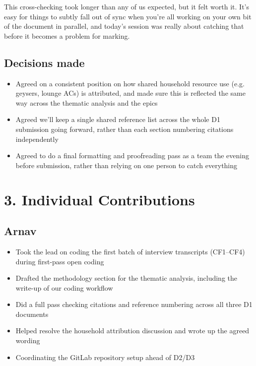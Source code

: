 \documentclass[11pt,a4paper]{article}
\begin{document}
This cross-checking took longer than any of us expected, but it felt worth it. It's easy for things to subtly fall out of sync when you're all working on your own bit of the document in parallel, and today's session was really about catching that before it becomes a problem for marking.

\vspace{6pt}
\subsection*{Decisions made}
\begin{itemize}
    \item Agreed on a consistent position on how shared household resource use (e.g. geysers, lounge ACs) is attributed, and made sure this is reflected the same way across the thematic analysis and the epics
    \item Agreed we'll keep a single shared reference list across the whole D1 submission going forward, rather than each section numbering citations independently
    \item Agreed to do a final formatting and proofreading pass as a team the evening before submission, rather than relying on one person to catch everything
\end{itemize}

\vspace{10pt}
\section*{3. Individual Contributions}

\subsection*{Arnav}
\begin{itemize}
    \item Took the lead on coding the first batch of interview transcripts (CF1--CF4) during first-pass open coding
    \item Drafted the methodology section for the thematic analysis, including the write-up of our coding workflow
    \item Did a full pass checking citations and reference numbering across all three D1 documents
    \item Helped resolve the household attribution discussion and wrote up the agreed wording
    \item Coordinating the GitLab repository setup ahead of D2/D3
\end{itemize}
\end{document}
